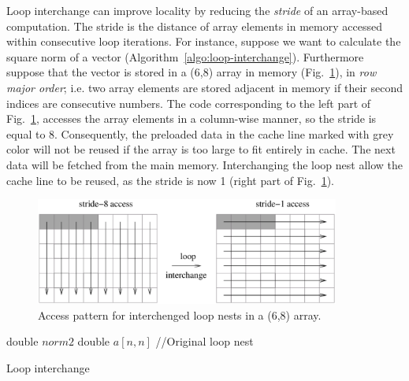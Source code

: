 Loop interchange can improve locality by reducing the \textit{stride} of an array-based computation. The stride is the distance of array elements in memory accessed within consecutive loop iterations. For instance, suppose we want to calculate the square norm of a vector (Algorithm~\ref{algo:loop-interchange}). Furthermore suppose that the vector is stored in a (6,8) array in memory (Fig.~\ref{fig:interchanged-loop-nests}), in \textit{row major order}; i.e. two array elements are stored adjacent in memory if their second indices are consecutive numbers. The code corresponding to the left part of Fig.~\ref{fig:interchanged-loop-nests}, accesses the array elements in a column-wise manner, so the stride is equal to 8. Consequently, the preloaded data in the cache line marked with grey color will not be reused if the array is too large to fit entirely in cache. The next data will be fetched from the main memory. Interchanging the loop nest allow the cache line to be reused, as the stride is now 1 (right part of Fig.~\ref{fig:interchanged-loop-nests}). \\
\begin{figure}
   \centering
   \includegraphics[width=10cm]{Figs/Interchanged_loop_nests.eps}
   \caption{Access pattern for interchenged loop nests in a (6,8) array.} \label{fig:interchanged-loop-nests}
\end{figure} 


\begin{algorithm}[t]
\SetAlgoLined
double $norm2$\;
double $a[n,n]$\;
//Original loop nest\;
\caption{Loop interchange} \label{algo:loop-interchange}
\end{algorithm}


